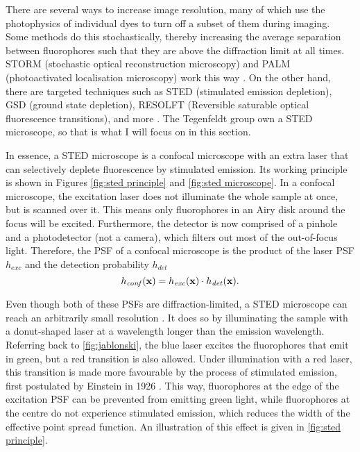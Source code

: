 There are several ways to increase image resolution, many of which use the photophysics of individual dyes to turn off a subset of them during imaging. Some methods do this stochastically, thereby increasing the average separation between fluorophores such that they are above the diffraction limit at all times. STORM (stochastic optical reconstruction microscopy) and PALM (photoactivated localisation microscopy) work this way \cite{Mock2009, Betzig2006}. On the other hand, there are targeted techniques such as STED (stimulated emission depletion), GSD (ground state depletion), RESOLFT (Reversible saturable optical fluorescence transitions), and more \cite{Klar2000, Folling2008, Hofmann2005}. The Tegenfeldt group own a STED microscope, so that is what I will focus on in this section.

In essence, a STED microscope is a confocal microscope with an extra laser that can selectively deplete fluorescence by stimulated emission. Its working principle is shown in Figures \ref{fig:sted principle} and \ref{fig:sted microscope}. In a confocal microscope, the excitation laser does not illuminate the whole sample at once, but is scanned over it. This means only fluorophores in an Airy disk around the focus will be excited. Furthermore, the detector is now comprised of a pinhole and a photodetector (not a camera), which filters out most of the out-of-focus light. Therefore, the PSF of a confocal microscope is the product of the laser PSF $ h_\mathit{exc} $ and the detection probability $ h_\mathit{det} $
\begin{equation}
	h_\mathit{conf}(\vb{x}) = h_\mathit{exc}(\vb{x}) \cdot h_\mathit{det}(\vb{x}).
\end{equation}

Even though both of these PSFs are diffraction-limited, a STED microscope can reach an arbitrarily small resolution \cite{Wildanger2012}. It does so by illuminating the sample with a donut-shaped laser at a wavelength longer than the emission wavelength. Referring back to \autoref{fig:jablonski}, the blue laser excites the fluorophores that emit in green, but a red transition is also allowed. Under illumination with a red laser, this transition is made more favourable by the process of stimulated emission, first postulated by Einstein in 1926 \cite{Einstein1926}. This way, fluorophores at the edge of the excitation PSF can be prevented from emitting green light, while fluorophores at the centre do not experience stimulated emission, which reduces the width of the effective point spread function. An illustration of this effect is given in \autoref{fig:sted principle}.

